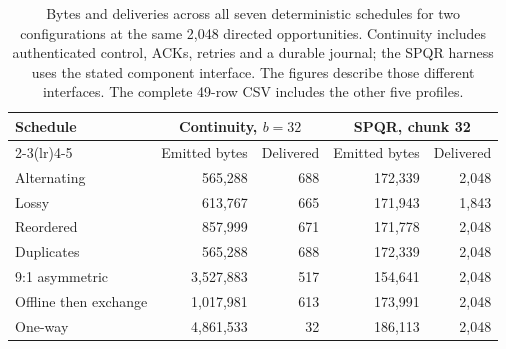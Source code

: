 \begin{table}[t]
\centering
\small
\setlength{\tabcolsep}{4pt}
\begin{tabular}{@{}lrrrr@{}}
\toprule
Schedule & \multicolumn{2}{c}{Continuity, $b=32$} & \multicolumn{2}{c}{SPQR, chunk 32}\\
\cmidrule(lr){2-3}\cmidrule(lr){4-5}
 & Emitted bytes & Delivered & Emitted bytes & Delivered\\
\midrule
Alternating & 565,288 & 688 & 172,339 & 2,048\\
Lossy & 613,767 & 665 & 171,943 & 1,843\\
Reordered & 857,999 & 671 & 171,778 & 2,048\\
Duplicates & 565,288 & 688 & 172,339 & 2,048\\
9:1 asymmetric & 3,527,883 & 517 & 154,641 & 2,048\\
Offline then exchange & 1,017,981 & 613 & 173,991 & 2,048\\
One-way & 4,861,533 & 32 & 186,113 & 2,048\\
\bottomrule
\end{tabular}
\caption{Bytes and deliveries across all seven deterministic schedules for two configurations at the same 2,048 directed opportunities. Continuity includes authenticated control, ACKs, retries and a durable journal; the SPQR harness uses the stated component interface. The figures describe those different interfaces. The complete 49-row CSV includes the other five profiles.}
\label{tab:matched-schedule-costs}
\end{table}
